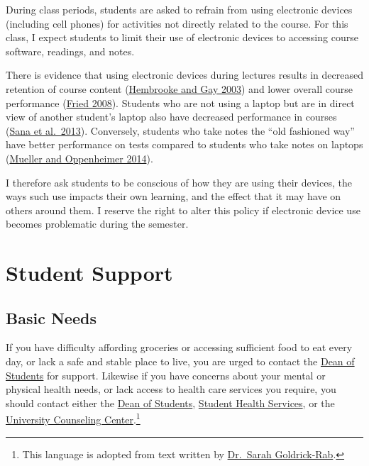 \documentclass[
]{book}
\begin{document}
During class periods, students are asked to refrain from using electronic devices (including cell phones) for activities not directly related to the course. For this class, I expect students to limit their use of electronic devices to accessing course software, readings, and notes.

There is evidence that using electronic devices during lectures results in decreased retention of course content (\href{https://link.springer.com/article/10.1007/BF02940852}{Hembrooke and Gay 2003}) and lower overall course performance (\href{https://www.sciencedirect.com/science/article/pii/S0360131506001436}{Fried 2008}). Students who are not using a laptop but are in direct view of another student's laptop also have decreased performance in courses (\href{https://www.sciencedirect.com/science/article/pii/S0360131512002254}{Sana et al.~2013}). Conversely, students who take notes the ``old fashioned way'' have better performance on tests compared to students who take notes on laptops (\href{http://journals.sagepub.com/doi/abs/10.1177/0956797614524581}{Mueller and Oppenheimer 2014}).

I therefore ask students to be conscious of how they are using their devices, the ways such use impacts their own learning, and the effect that it may have on others around them. I reserve the right to alter this policy if electronic device use becomes problematic during the semester.

\hypertarget{student-support}{%
\section{Student Support}\label{student-support}}

\hypertarget{basic-needs}{%
\subsection{Basic Needs}\label{basic-needs}}

If you have difficulty affording groceries or accessing sufficient food to eat every day, or lack a safe and stable place to live, you are urged to contact the \href{https://www.slu.edu/student-development/dean-of-students/index.php}{Dean of Students} for support. Likewise if you have concerns about your mental or physical health needs, or lack access to health care services you require, you should contact either the \href{https://www.slu.edu/student-development/dean-of-students/index.php}{Dean of Students}, \href{https://www.slu.edu/life-at-slu/student-health/index.php}{Student Health Services}, or the \href{https://www.slu.edu/life-at-slu/university-counseling/index.php}{University Counseling Center}.\footnote{This language is adopted from text written by \href{https://medium.com/@saragoldrickrab/basic-needs-security-and-the-syllabus-d24cc7afe8c9}{Dr.~Sarah Goldrick-Rab}.}
\end{document}
